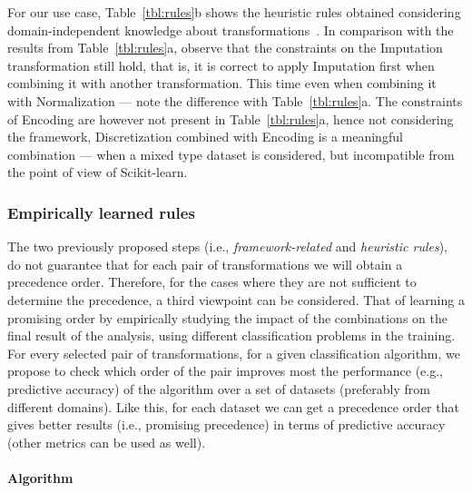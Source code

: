 \begin{example}
For our use case, Table~\ref{tbl:rules}b shows the heuristic rules obtained considering domain-independent knowledge about transformations~\cite{BookExploratoryDM03Dasu}. In comparison with the results from Table~\ref{tbl:rules}a, observe that the constraints on the Imputation transformation still hold, that is, it is correct to apply Imputation first when combining it with another transformation. This time even when combining it with Normalization --- note the difference with Table~\ref{tbl:rules}a. The constraints of Encoding are however not present in Table~\ref{tbl:rules}a, hence not considering the framework, Discretization combined with Encoding is a meaningful combination --- when a mixed type dataset is considered, but incompatible from the point of view of Scikit-learn.
\end{example}

\subsubsection{Empirically learned rules}
\label{ssec:rules-learned}

The two previously proposed steps (i.e., \textit{framework-related} and \textit{heuristic rules}), do not guarantee that for each pair of transformations we will obtain a precedence order. Therefore, for the cases where they are not sufficient to determine the precedence, a third viewpoint can be considered. That of learning a promising order by empirically studying the impact of the combinations on the final result of the analysis, using different classification problems in the training. For every selected pair of transformations, for a given classification algorithm, we propose to check which order of the pair improves most the performance (e.g., predictive accuracy) of the algorithm over a set of datasets (preferably from different domains). Like this, for each dataset we can get a precedence order that gives better results (i.e., promising precedence) in terms of predictive accuracy (other metrics can be used as well). 

\paragraph{Algorithm}
\label{ssec:rules-learned:algorithm}

